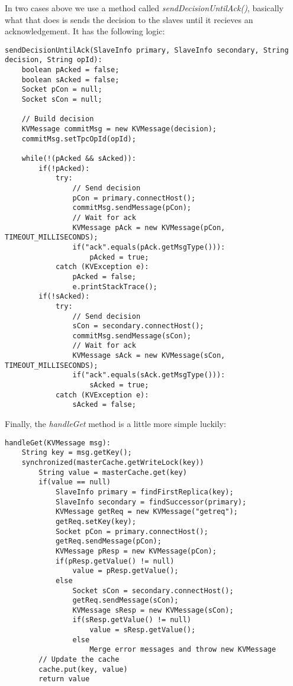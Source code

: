 \documentclass{article}
\begin{document}
In two cases above we use a method called \textit{sendDecisionUntilAck()}, basically what that does is sends the
decision to the slaves until it recieves an acknowledgement. It has the following logic:
\begin{verbatim}
sendDecisionUntilAck(SlaveInfo primary, SlaveInfo secondary, String decision, String opId):
    boolean pAcked = false;
    boolean sAcked = false;
    Socket pCon = null;
    Socket sCon = null;

    // Build decision
    KVMessage commitMsg = new KVMessage(decision);
    commitMsg.setTpcOpId(opId);

    while(!(pAcked && sAcked)):
        if(!pAcked):
            try:
                // Send decision
                pCon = primary.connectHost();
                commitMsg.sendMessage(pCon);
                // Wait for ack
                KVMessage pAck = new KVMessage(pCon, TIMEOUT_MILLISECONDS);
                if("ack".equals(pAck.getMsgType())):
                    pAcked = true;
            catch (KVException e):
                pAcked = false;
                e.printStackTrace();
        if(!sAcked):
            try:
                // Send decision
                sCon = secondary.connectHost();
                commitMsg.sendMessage(sCon);
                // Wait for ack
                KVMessage sAck = new KVMessage(sCon, TIMEOUT_MILLISECONDS);
                if("ack".equals(sAck.getMsgType())):
                    sAcked = true;
            catch (KVException e):
                sAcked = false;
\end{verbatim}

Finally, the \textit{handleGet} method is a little more simple luckily:
\begin{verbatim}
handleGet(KVMessage msg):
    String key = msg.getKey();
    synchronized(masterCache.getWriteLock(key))
        String value = masterCache.get(key)
        if(value == null)
            SlaveInfo primary = findFirstReplica(key);
            SlaveInfo secondary = findSuccessor(primary);
            KVMessage getReq = new KVMessage("getreq");
            getReq.setKey(key);
            Socket pCon = primary.connectHost();
            getReq.sendMessage(pCon);
            KVMessage pResp = new KVMessage(pCon);
            if(pResp.getValue() != null)
                value = pResp.getValue();
            else
                Socket sCon = secondary.connectHost();
                getReq.sendMessage(sCon);
                KVMessage sResp = new KVMessage(sCon);
                if(sResp.getValue() != null)
                    value = sResp.getValue();
                else
                    Merge error messages and throw new KVMessage
        // Update the cache
        cache.put(key, value)
        return value
\end{verbatim}
\end{document}
